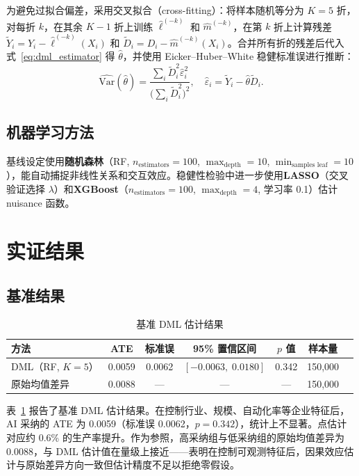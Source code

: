 \documentclass[UTF8,11pt,a4paper]{ctexart}
\begin{document}
为避免过拟合偏差，采用交叉拟合（cross-fitting）：将样本随机等分为 $K = 5$ 折，对每折 $k$，在其余 $K-1$ 折上训练 $\hat\ell^{(-k)}$ 和 $\hat m^{(-k)}$，在第 $k$ 折上计算残差 $\tilde Y_i = Y_i - \hat\ell^{(-k)}(X_i)$ 和 $\tilde D_i = D_i - \hat m^{(-k)}(X_i)$。合并所有折的残差后代入式~\eqref{eq:dml_estimator} 得 $\hat\theta$，并使用 Eicker--Huber--White 稳健标准误进行推断：
\begin{equation*}
\widehat{\mathrm{Var}}(\hat\theta) = \frac{\sum_i \tilde D_i^2 \hat\varepsilon_i^2}{\bigl(\sum_i \tilde D_i^2\bigr)^2}, \quad
\hat\varepsilon_i = \tilde Y_i - \hat\theta \tilde D_i.
\end{equation*}

\subsection{机器学习方法}

基线设定使用\textbf{随机森林}（RF, $n_{\text{estimators}}=100$, $\max_{\text{depth}}=10$, $\min_{\text{samples leaf}}=10$），能自动捕捉非线性关系和交互效应。稳健性检验中进一步使用\textbf{LASSO}（交叉验证选择 $\lambda$）和\textbf{XGBoost}（$n_{\text{estimators}}=100$, $\max_{\text{depth}}=4$, 学习率 0.1）估计 nuisance 函数。

\section{实证结果}\label{sec:results}

\subsection{基准结果}

\begin{table}[H]
\centering
\caption{基准 DML 估计结果}
\label{tab:baseline}
\small
\begin{tabular}{lcccccc}
\toprule
方法 & ATE & 标准误 & 95\% 置信区间 & $p$ 值 & 样本量 \\
\midrule
DML（RF, $K=5$） & 0.0059 & 0.0062 & $[-0.0063,\;0.0180]$ & 0.342 & 150{,}000 \\
\midrule
原始均值差异 & 0.0088 & --- & --- & --- & 150{,}000 \\
\bottomrule
\end{tabular}
\end{table}

表~\ref{tab:baseline} 报告了基准 DML 估计结果。在控制行业、规模、自动化率等企业特征后，AI 采纳的 ATE 为 0.0059（标准误 0.0062，$p = 0.342$），统计上不显著。点估计对应约 0.6\% 的生产率提升。作为参照，高采纳组与低采纳组的原始均值差异为 0.0088，与 DML 估计值在量级上接近——表明在控制可观测特征后，因果效应估计与原始差异方向一致但估计精度不足以拒绝零假设。
\end{document}
